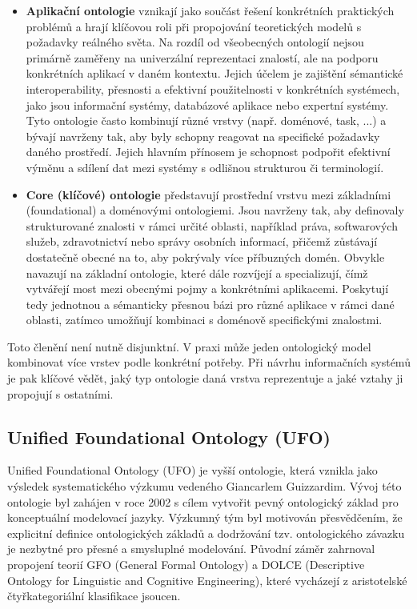 \begin{itemize}
  \item \textbf{Aplikační ontologie} vznikají jako součást řešení konkrétních praktických problémů a hrají klíčovou roli při propojování teoretických modelů s požadavky reálného světa. Na rozdíl od všeobecných ontologií nejsou primárně zaměřeny na univerzální reprezentaci znalostí, ale na podporu konkrétních aplikací v daném kontextu. Jejich účelem je zajištění sémantické interoperability, přesnosti a efektivní použitelnosti v konkrétních systémech, jako jsou informační systémy, databázové aplikace nebo expertní systémy. Tyto ontologie často kombinují různé vrstvy (např. doménové, task, ...) a bývají navrženy tak, aby byly schopny reagovat na specifické požadavky daného prostředí. Jejich hlavním přínosem je schopnost podpořit efektivní výměnu a sdílení dat mezi systémy s odlišnou strukturou či terminologií. \cite{Guarino2015, Ding2007,Katsumi2016}

  \item \textbf{Core (klíčové) ontologie} představují prostřední vrstvu mezi základními (foundational) a doménovými ontologiemi. Jsou navrženy tak, aby definovaly strukturované znalosti v rámci určité oblasti, například práva, softwarových služeb, zdravotnictví nebo správy osobních informací, přičemž zůstávají dostatečně obecné na to, aby pokrývaly více příbuzných domén. Obvykle navazují na základní ontologie, které dále rozvíjejí a specializují, čímž vytvářejí most mezi obecnými pojmy a konkrétními aplikacemi.
    Poskytují tedy jednotnou a sémanticky přesnou bázi pro různé aplikace v rámci dané oblasti, zatímco umožňují kombinaci s doménově specifickými znalostmi.\cite{Guarino2009,Guizzardi2005,Scherp2011}
\end{itemize}
Toto členění není nutně disjunktní. V praxi může jeden ontologický model kombinovat více vrstev podle konkrétní potřeby. Při návrhu informačních systémů je pak klíčové vědět, jaký typ ontologie daná vrstva reprezentuje a jaké vztahy ji propojují s ostatními. \cite{Guarino2009}


\subsection{Unified Foundational Ontology (UFO)}
\label{sec:unified-foundational-ontology-ufo}
Unified Foundational Ontology (UFO) je vyšší ontologie, která vznikla jako výsledek systematického výzkumu vedeného Giancarlem Guizzardim. Vývoj této ontologie byl zahájen v roce 2002 s cílem vytvořit pevný ontologický základ pro konceptuální modelovací jazyky. Výzkumný tým byl motivován přesvědčením, že explicitní definice ontologických základů a dodržování tzv. ontologického závazku je nezbytné pro přesné a smysluplné modelování. Původní záměr zahrnoval propojení teorií GFO (General Formal Ontology) a DOLCE (Descriptive Ontology for Linguistic and Cognitive Engineering), které vycházejí z aristotelské čtyřkategoriální klasifikace jsoucen. \cite{Guizzardi2015}

